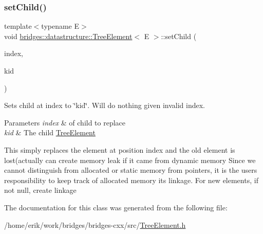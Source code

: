 \subsubsection{\texorpdfstring{set\+Child()}{setChild()}}
{\footnotesize\ttfamily template$<$typename E$>$ \\
void \hyperlink{classbridges_1_1datastructure_1_1_tree_element}{bridges\+::datastructure\+::\+Tree\+Element}$<$ E $>$\+::set\+Child (\begin{DoxyParamCaption}\item[{const size\+\_\+t \&}]{index,  }\item[{\hyperlink{classbridges_1_1datastructure_1_1_tree_element}{Tree\+Element}$<$ E $>$ $\ast$}]{kid }\end{DoxyParamCaption})\hspace{0.3cm}{\ttfamily [inline]}}

Sets child at index to \char`\"{}kid\char`\"{}. Will do nothing given invalid index.


\begin{DoxyParams}{Parameters}
{\em index} & of child to replace \\
\hline
{\em kid} & The child \hyperlink{classbridges_1_1datastructure_1_1_tree_element}{Tree\+Element} \\
\hline
\end{DoxyParams}
This simply replaces the element at position index and the old element is lost(actually can create memory leak if it came from dynamic memory Since we cannot distinguish from allocated or static memory from pointers, it is the user\textquotesingle{}s responsibility to keep track of allocated memory its linkage. For new elements, if not null, create linkage

The documentation for this class was generated from the following file\+:\begin{DoxyCompactItemize}
\item 
/home/erik/work/bridges/bridges-\/cxx/src/\hyperlink{_tree_element_8h}{Tree\+Element.\+h}\end{DoxyCompactItemize}
